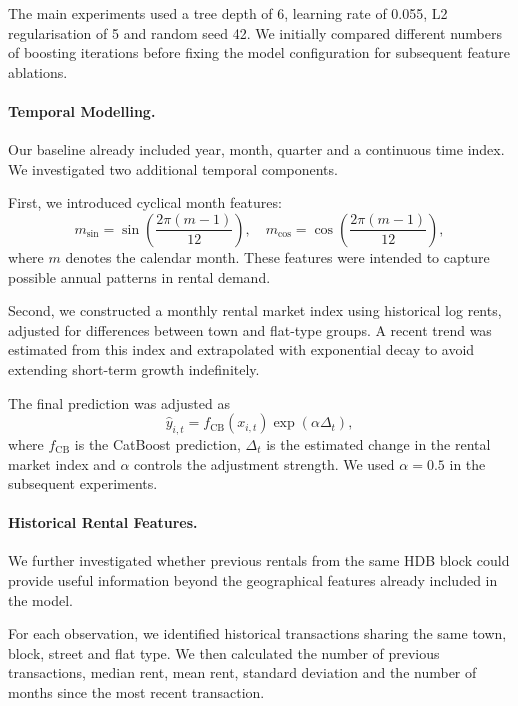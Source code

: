 \documentclass[11pt,a4paper]{article}
\begin{document}
The main experiments used a tree depth of 6, learning rate of 0.055, L2 regularisation of 5 and random seed 42. We initially compared different numbers of boosting iterations before fixing the model configuration for subsequent feature ablations.

\paragraph{Temporal Modelling.}
Our baseline already included year, month, quarter and a continuous time index. We investigated two additional temporal components.

First, we introduced cyclical month features:
\begin{equation}
    m_{\sin} = \sin\left(\frac{2\pi(m-1)}{12}\right),
    \quad
    m_{\cos} = \cos\left(\frac{2\pi(m-1)}{12}\right),
\end{equation}
where $m$ denotes the calendar month. These features were intended to capture possible annual patterns in rental demand.

Second, we constructed a monthly rental market index using historical log rents, adjusted for differences between town and flat-type groups. A recent trend was estimated from this index and extrapolated with exponential decay to avoid extending short-term growth indefinitely.

The final prediction was adjusted as
\begin{equation}
    \hat{y}_{i,t}
    =
    f_{\mathrm{CB}}(x_{i,t})
    \exp\left(\alpha\Delta_t\right),
\end{equation}
where $f_{\mathrm{CB}}$ is the CatBoost prediction, $\Delta_t$ is the estimated change in the rental market index and $\alpha$ controls the adjustment strength. We used $\alpha=0.5$ in the subsequent experiments.

\paragraph{Historical Rental Features.}
We further investigated whether previous rentals from the same HDB block could provide useful information beyond the geographical features already included in the model.

For each observation, we identified historical transactions sharing the same town, block, street and flat type. We then calculated the number of previous transactions, median rent, mean rent, standard deviation and the number of months since the most recent transaction.
\end{document}
